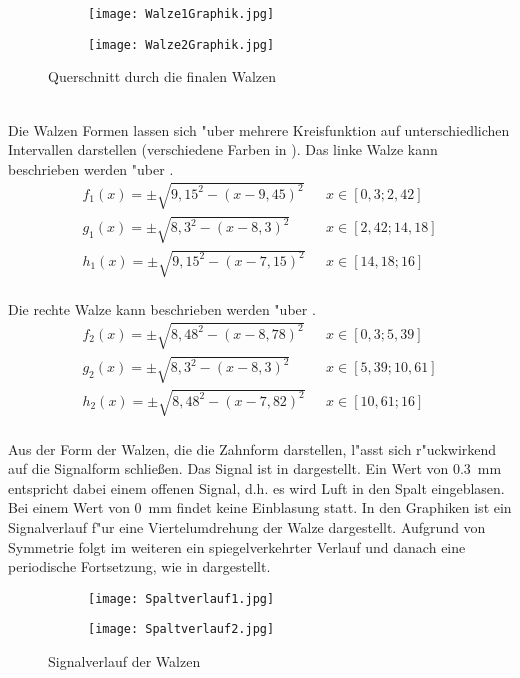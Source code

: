 \begin{figure}[h]
	\centering
	\begin{subfigure}[c]{0.4\textwidth}		
		\texttt{[image: Walze1Graphik.jpg]}
	\end{subfigure}
	\begin{subfigure}[c]{0.4\textwidth}
		\texttt{[image: Walze2Graphik.jpg]}
	\end{subfigure}
	\caption{Querschnitt durch die finalen Walzen}
	\label{fig:finalesdesign}
\end{figure}\\

Die Walzen Formen lassen sich "uber mehrere Kreisfunktion auf unterschiedlichen Intervallen darstellen (verschiedene Farben in ). Das linke Walze kann beschrieben werden "uber .
\begin{align}
	{f_1(x)}=\pm\sqrt{9,15^{2}-(x-9,45)^{2}}\,\,\,\,&x\in[0,3; 2,42] \label{eq:Walze1}\\
	{g_1(x)}=\pm\sqrt{8,3^{2}-(x-8,3)^{2}}\,\,\,\,&x\in[2,42; 14,18] \nonumber\\
	{h_1(x)}=\pm\sqrt{9,15^{2}-(x-7,15)^{2}}\,\,\,\,&x\in[14,18; 16] \nonumber
\end{align}\\
Die rechte Walze kann beschrieben werden "uber .
\begin{align}
	{f_2(x)}=\pm\sqrt{8,48^{2}-(x-8,78)^{2}}\,\,\,\,&x\in[0,3; 5,39] \label{eq:Walze2}\\
	{g_2(x)}=\pm\sqrt{8,3^{2}-(x-8,3)^{2}}\,\,\,\,&x\in[5,39; 10,61] \nonumber\\
	{h_2(x)}=\pm\sqrt{8,48^{2}-(x-7,82)^{2}}\,\,\,\,&x\in[10,61; 16] \nonumber
\end{align}\\
Aus der Form der Walzen, die die Zahnform darstellen, l"asst sich r"uckwirkend auf die Signalform schlie\ss{}en. Das Signal ist in  dargestellt. Ein Wert von \SI{0,3}{\milli\meter} entspricht dabei einem offenen Signal, d.h. es wird Luft in den Spalt eingeblasen. Bei einem Wert von \SI{0}{\milli\meter} findet keine Einblasung statt. In den Graphiken ist ein Signalverlauf f"ur eine Viertelumdrehung der Walze dargestellt. Aufgrund von Symmetrie folgt im weiteren ein spiegelverkehrter Verlauf und danach eine periodische Fortsetzung, wie in  dargestellt.
\begin{figure}[h]
	\centering
	\begin{subfigure}[c]{0.5\textwidth}		
		\texttt{[image: Spaltverlauf1.jpg]}
	\end{subfigure}
	\begin{subfigure}[c]{0.5\textwidth}
		\texttt{[image: Spaltverlauf2.jpg]}
	\end{subfigure}
	\caption{Signalverlauf der Walzen}
	\label{fig:spaltverlauf}
\end{figure}\\
